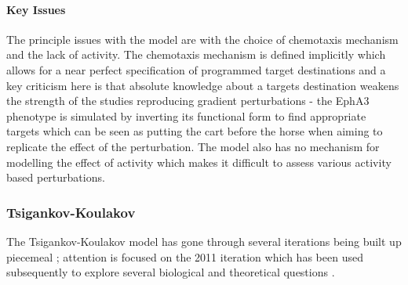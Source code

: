 \paragraph{Key Issues}
The principle issues with the model are with the choice of chemotaxis mechanism and the lack of activity. The chemotaxis mechanism is defined implicitly which allows for a near perfect specification of programmed target destinations and a key criticism here is that absolute knowledge about a targets destination weakens the strength of the studies reproducing gradient perturbations - the EphA3 phenotype is simulated by inverting its functional form to find appropriate targets which can be seen as putting the cart before the horse when aiming to replicate the effect of the perturbation. The model also has no mechanism for modelling the effect of activity which makes it difficult to assess various activity based perturbations.
\subsubsection{Tsigankov-Koulakov \label{sec:koulakov}}
The Tsigankov-Koulakov model has gone through several iterations being built up piecemeal \cite{Koulakov2004-ia, Tsigankov2006-uy, Tsigankov2010-on, Triplett2011-jk, Wei2013-jw}; attention is focused on the 2011 iteration which has been used subsequently to explore several biological and theoretical questions \cite{Triplett2011-jk, Savier2017-wt, Tikidji-Hamburyan2016-sn}. 
